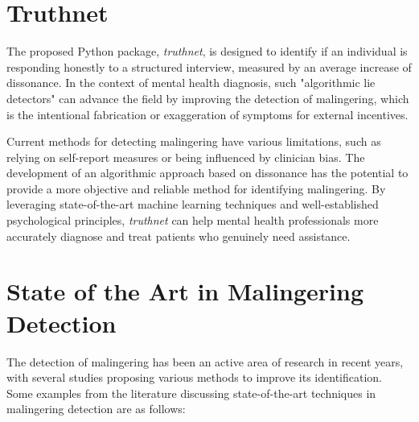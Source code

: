 \documentclass[onecolumn, compsoc,10pt]{IEEEtran}
\begin{document}
\section{Truthnet}

The proposed Python package, \textit{truthnet}, is designed to identify if an individual is responding honestly to a structured interview, measured by an average increase of dissonance. In the context of mental health diagnosis, such "algorithmic lie detectors" can advance the field by improving the detection of malingering, which is the intentional fabrication or exaggeration of symptoms for external incentives.

Current methods for detecting malingering have various limitations, such as relying on self-report measures or being influenced by clinician bias. The development of an algorithmic approach based on dissonance has the potential to provide a more objective and reliable method for identifying malingering. By leveraging state-of-the-art machine learning techniques and well-established psychological principles, \textit{truthnet} can help mental health professionals more accurately diagnose and treat patients who genuinely need assistance.

\section{State of the Art in Malingering Detection}

The detection of malingering has been an active area of research in recent years, with several studies proposing various methods to improve its identification. Some examples from the literature discussing state-of-the-art techniques in malingering detection are as follows:
\end{document}
